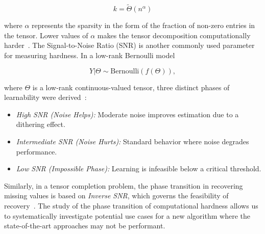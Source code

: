 \[
k = \tilde{\Theta}(n^{\alpha})
\]

where $\alpha$ represents the sparsity in the form of the fraction of non-zero entries in the tensor. Lower values of $\alpha$ makes the tensor decomposition computationally harder~\cite{luo2022tensor}. The Signal-to-Noise Ratio (SNR) is another commonly used parameter for measuring hardness. In a low-rank Bernoulli model


\[
Y | \Theta \sim \text{Bernoulli}(f(\Theta)), 
\]

where $\Theta$ is a low-rank continuous-valued tensor, three  distinct phases of learnability were derived~\cite{wang2020learning}: 
\begin{itemize}
    \item \textit{High SNR (Noise Helps):} Moderate noise improves estimation due to a dithering effect.
    \item \textit{Intermediate SNR (Noise Hurts):} Standard behavior where noise degrades performance.
    \item \textit{Low SNR (Impossible Phase):} Learning is infeasible below a critical threshold.
\end{itemize}
Similarly, in a tensor completion problem, the phase transition in recovering missing values is based on \textit{Inverse SNR}, which governs the feasibility of recovery~\cite{stephan2024non}. The study of the phase transition of computational hardness  allows us to systematically investigate potential use cases for a new algorithm where the state-of-the-art approaches may not be performant.


